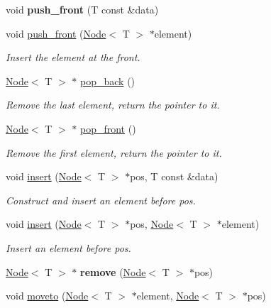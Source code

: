 \begin{DoxyCompactItemize}
\mbox{\label{classList_ab3a121baf35c7fa3f83717ede3a46e1b}} 
void {\bfseries push\+\_\+front} (T const \&data)
\item 
void \hyperlink{classList_aeb009afd4f0f626603455d5ee9e3dfc3}{push\+\_\+front} (\hyperlink{structNode}{Node}$<$ T $>$ $\ast$element)
\begin{DoxyCompactList}\small\item\em Insert the element at the front. \end{DoxyCompactList}\item 
\hyperlink{structNode}{Node}$<$ T $>$ $\ast$ \hyperlink{classList_aca64c15e326dd7515499310bc9f2efb0}{pop\+\_\+back} ()
\begin{DoxyCompactList}\small\item\em Remove the last element, return the pointer to it. \end{DoxyCompactList}\item 
\hyperlink{structNode}{Node}$<$ T $>$ $\ast$ \hyperlink{classList_a3188f038a0b9c0a578bccdf7348f42b5}{pop\+\_\+front} ()
\begin{DoxyCompactList}\small\item\em Remove the first element, return the pointer to it. \end{DoxyCompactList}\item 
void \hyperlink{classList_af583e46c2dad89c3f29be38a52dd27bc}{insert} (\hyperlink{structNode}{Node}$<$ T $>$ $\ast$pos, T const \&data)
\begin{DoxyCompactList}\small\item\em Construct and insert an element before pos. \end{DoxyCompactList}\item 
void \hyperlink{classList_ac7fcefb285d5b4991be548342f9b86e9}{insert} (\hyperlink{structNode}{Node}$<$ T $>$ $\ast$pos, \hyperlink{structNode}{Node}$<$ T $>$ $\ast$element)
\begin{DoxyCompactList}\small\item\em Insert an element before pos. \end{DoxyCompactList}\item 
\mbox{\label{classList_a835180f96db12ee4793c77562fbf02be}} 
\hyperlink{structNode}{Node}$<$ T $>$ $\ast$ {\bfseries remove} (\hyperlink{structNode}{Node}$<$ T $>$ $\ast$pos)
\item 
void \hyperlink{classList_a5bfb723e873c6af1e03b085a24ad62f4}{moveto} (\hyperlink{structNode}{Node}$<$ T $>$ $\ast$element, \hyperlink{structNode}{Node}$<$ T $>$ $\ast$pos)

\end{DoxyCompactItemize}
